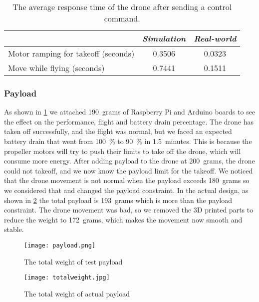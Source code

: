 \documentclass[../main.tex]{subfiles}
\begin{document}
\begin{table}[H]
	\centering
	\caption{The average response time of the drone after sending a control command.}
	\label{tab:respone-time}
	\begin{tabularx}{0.7\textwidth}{ X c c }
		\toprule
		\textit{} & \textit{Simulation} & \textit{Real-world}\\ \midrule
		Motor ramping for takeoff (seconds)  & 0.3506 & 0.0323     \\
		Move while flying (seconds) & 0.7441  & 0.1511   \\
		\bottomrule
	\end{tabularx}
\end{table} 

\subsubsection{Payload}

As shown in \cref{fig:payload}
we attached \SI{190}{grams} of Raspberry Pi and Arduino boards
to see the effect on the performance, flight and
battery drain percentage. 
The drone has taken off  successfully, 
and the flight was normal, but we faced an expected 
battery drain that went from 
\SI{100}{\percent} to \SI{90}{\percent} in 
\SI{1.5}{minutes}. This is because the propeller motors will try to push 
their limits to take off the drone, which will consume more energy.
After adding payload to the drone at \SI{200}{grams}, the drone could not
takeoff, and we now know the payload limit for the takeoff. We noticed that the drone movement
is not normal when the payload exceeds \SI{180}{grams} so we considered that and changed
the payload constraint. In the actual design, as shown in 
\cref{fig:actual-total-weight} the total payload 
is \SI{193}{grams} which is more than the payload constraint. The drone movement was bad, so we removed the 3D printed
parts to reduce the weight to \SI{172}{grams}, which makes the movement now smooth and 
stable.



\begin{figure}[H]
	\centering
	\texttt{[image: payload.png]}
	\caption{The total weight of test payload}
	\label{fig:payload}
\end{figure} 

\begin{figure}[H]
	\centering
	\texttt{[image: totalweight.jpg]}
	\caption{The total weight of actual payload}
	\label{fig:actual-total-weight}
\end{figure} 
\end{document}
